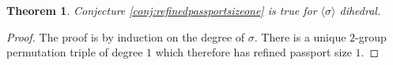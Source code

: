 \documentclass{dcthesis}
\newcommand{\ZZ}{\mathbb Z}
\newcommand{\wt}[1]{\widetilde{#1}}
\DeclareMathOperator{\Aut}{Aut}
\numberwithin{equation}{section}
\newtheorem{theorem}[equation]{Theorem}
\theoremstyle{definition}
\theoremstyle{remark}
\begin{document}
{{{      %
    \begin{theorem}
      \label{thm:conjecturedihedral}
      Conjecture
      \ref{conj:refinedpassportsizeone}
      is true for
      $\langle\sigma\rangle$
      dihedral.
    \end{theorem}
    \begin{proof}
      The proof is by induction on the
      degree of $\sigma$.
      There is a unique $2$-group permutation
      triple of degree $1$ which
      therefore has refined passport size $1$.

\end{proof}}}}
\end{document}
